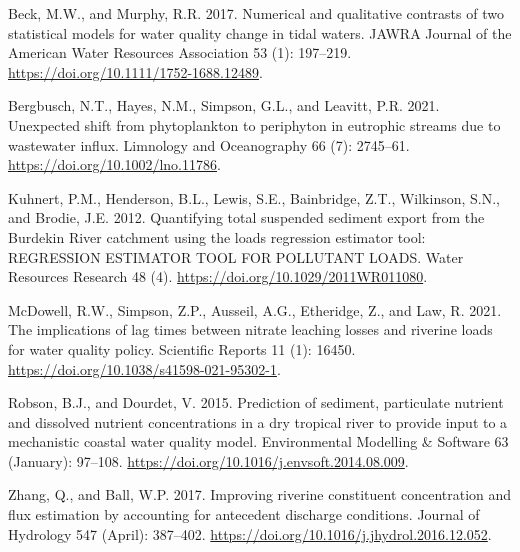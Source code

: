 \documentclass[
]{article}
\newlength{\cslhangindent}
\newlength{\cslentryspacingunit} %
\newenvironment{CSLReferences}[2] %
 {%
  \setlength{\parindent}{0pt}
  \ifodd #1
  \let\oldpar\par
  \def\par{\hangindent=\cslhangindent\oldpar}
  \fi
  \setlength{\parskip}{#2\cslentryspacingunit}
 }%
 {}
\begin{document}
\hypertarget{refs}{}
\begin{CSLReferences}{1}{0}
\leavevmode{}%
Beck, M.W., and Murphy, R.R. 2017. Numerical and qualitative contrasts
of two statistical models for water quality change in tidal waters.
JAWRA Journal of the American Water Resources Association 53 (1):
197--219. \url{https://doi.org/10.1111/1752-1688.12489}.

\leavevmode{}%
Bergbusch, N.T., Hayes, N.M., Simpson, G.L., and Leavitt, P.R. 2021.
Unexpected shift from phytoplankton to periphyton in eutrophic streams
due to wastewater influx. Limnology and Oceanography 66 (7): 2745--61.
\url{https://doi.org/10.1002/lno.11786}.

\leavevmode{}%
Kuhnert, P.M., Henderson, B.L., Lewis, S.E., Bainbridge, Z.T.,
Wilkinson, S.N., and Brodie, J.E. 2012. Quantifying total suspended
sediment export from the Burdekin River catchment using the loads
regression estimator tool: REGRESSION ESTIMATOR TOOL FOR POLLUTANT
LOADS. Water Resources Research 48 (4).
\url{https://doi.org/10.1029/2011WR011080}.

\leavevmode{}%
McDowell, R.W., Simpson, Z.P., Ausseil, A.G., Etheridge, Z., and Law, R.
2021. The implications of lag times between nitrate leaching losses and
riverine loads for water quality policy. Scientific Reports 11 (1):
16450. \url{https://doi.org/10.1038/s41598-021-95302-1}.

\leavevmode{}%
Robson, B.J., and Dourdet, V. 2015. Prediction of sediment, particulate
nutrient and dissolved nutrient concentrations in a dry tropical river
to provide input to a mechanistic coastal water quality model.
Environmental Modelling \& Software 63 (January): 97--108.
\url{https://doi.org/10.1016/j.envsoft.2014.08.009}.

\leavevmode{}%
Zhang, Q., and Ball, W.P. 2017. Improving riverine constituent
concentration and flux estimation by accounting for antecedent discharge
conditions. Journal of Hydrology 547 (April): 387--402.
\url{https://doi.org/10.1016/j.jhydrol.2016.12.052}.

\end{CSLReferences}
\end{document}
